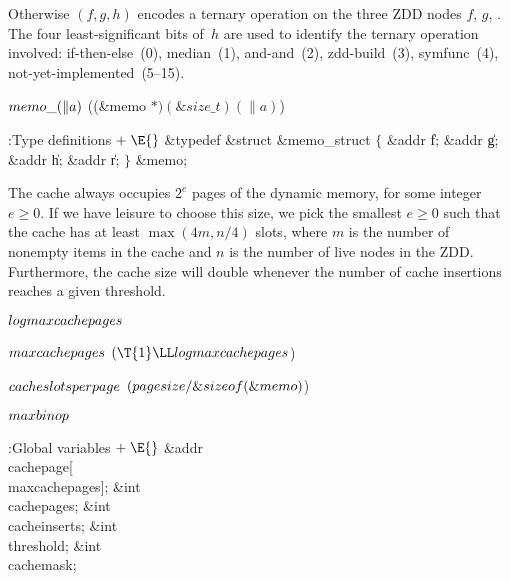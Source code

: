 \smallskip\textindent{$\bullet$} Otherwise $(f,g,h)$ encodes a ternary
operation on the three ZDD nodes $f$, $g$, . The four
least-significant
bits of~$h$ are used to identify the ternary operation involved:
if-then-else~(0),
median~(1),
and-and~(2),
zdd-build~(3),
symfunc~(4),
not-yet-implemented~(5--15).

\Y\B\4\D$\\{memo\_}(\|a)$ \5
((\&{memo} ${}{*})(\&{size\_t})(\|a){}$)\par
\Y\B\4:Type definitions\X${}\mathrel+\E{}$\6
\&{typedef} \&{struct} \&{memo\_struct} ${}\{{}$\1\6
\&{addr} \|f;\6
\&{addr} \|g;\6
\&{addr} \|h;\6
\&{addr} \|r;\2\6
${}\}{}$ \&{memo};\par
\fi

The cache always occupies $2^e$ pages of the dynamic memory,
for some integer $e\ge0$. If we have leisure to choose this size, we pick
the smallest $e\ge0$ such that the cache has at least $\max(4m,n/4)$ slots,
where $m$ is the number of nonempty items in the cache and $n$ is
the number of live nodes in the ZDD. Furthermore, the cache size
will double whenever the number of cache insertions reaches a
given threshold.

\Y\B\4\D$\\{logmaxcachepages}$ \5
\par
\B\4\D$\\{maxcachepages}$ \5
$(\T{1}\LL\\{logmaxcachepages}{}$)\par
\B\4\D$\\{cacheslotsperpage}$ \5
$(\\{pagesize}/\&{sizeof}(\&{memo}){}$)\par
\B\4\D$\\{maxbinop}$ \5
\par
\Y\B\4:Global variables\X${}\mathrel+\E{}$\6
\&{addr} \\{cachepage}[\\{maxcachepages}];\6
\&{int} \\{cachepages};\6
\&{int} \\{cacheinserts};\6
\&{int} \\{threshold};\6
\&{int} \\{cachemask};\par
\fi

